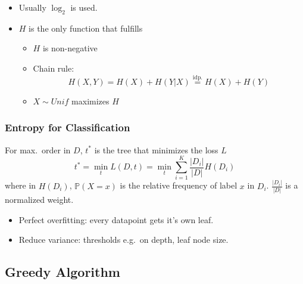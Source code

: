 
\begin{itemize}
    \item Usually $\log_2$ is used.
    \item $H$ is the only function that fulfills
          \begin{itemize}
              \item $H$ is non-negative
              \item Chain rule:
              \noindent\begin{equation*}
                H(X,Y) = H(X) + H(Y|X) \overset{\mathrm{idp.}}{=} H(X) + H(Y)
              \end{equation*}
              \item $X\sim Unif$ maximizes $H$
          \end{itemize}
\end{itemize}

\subsubsection{Entropy for Classification}
For max.\ order in $D$, $t^*$ is the tree that minimizes the loss $L$
\noindent\begin{equation*}
    t^* = \min_t L(D,t) =\min_t \sum_{i=1}^{K} \frac{|D_i|}{|D|}H(D_i)
\end{equation*}
where in $H(D_i)$, $\mathbb{P}(X=x)$ is the relative frequency of label $x$ in $D_i$. $\frac{|D_i|}{|D|}$ is a normalized weight.

\newpar{}
\begin{itemize}
    \item Perfect overfitting: every datapoint gets it's own leaf.
    \item Reduce variance: thresholds e.g.\ on depth, leaf node size.
\end{itemize}

\subsection{Greedy Algorithm}

